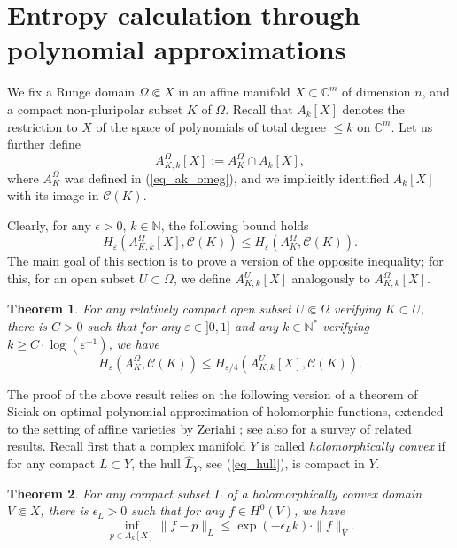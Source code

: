 \documentclass[12pt]{article}
\numberwithin{equation}{section}
\theoremstyle{theorem}
\newtheorem{thm}{Theorem}[section]
\theoremstyle{definition}
\theoremstyle{remark}
\newcommand{\comp}{\mathbb{C}}
\newcommand{\nat}{\mathbb{N}}
\begin{document}
	\section{Entropy calculation through polynomial approximations}\label{sect_poly}
	We fix a Runge domain $\Omega \Subset X$ in an affine manifold $X \subset \comp^m$ of dimension $n$, and a compact non-pluripolar subset $K$ of $\Omega$.
	Recall that $A_k[X]$ denotes the restriction to $X$ of the space of polynomials of total degree $\leq k$ on $\comp^m$.
	Let us further define
	\begin{equation}
		A_{K, k}^{\Omega}[X] := A_K^{\Omega} \cap A_k[X],
	\end{equation}
	where $A_K^{\Omega}$ was defined in (\ref{eq_ak_omeg}), and we implicitly identified $A_k[X]$ with its image in $\mathscr{C}(K)$.
	\par 
	Clearly, for any $\epsilon > 0$, $k \in \nat$, the following bound holds
	\begin{equation}\label{eq_entr_lower}
		H_{\varepsilon}(A_{K, k}^{\Omega}[X], \mathscr{C}(K))
		\leq
		H_{\varepsilon}(A_K^{\Omega}, \mathscr{C}(K)).
	\end{equation}
	The main goal of this section is to prove a version of the opposite inequality; for this, for an open subset $U \subset \Omega$, we define $A_{K, k}^{U}[X]$ analogously to $A_{K, k}^{\Omega}[X]$.
	\begin{thm}\label{thm_fin_appr}
		For any relatively compact open subset $U \Subset \Omega$ verifying $K \subset U$, there is $C > 0$ such that for any $\varepsilon \in ]0, 1]$ and any $k \in \nat^*$ verifying $k \geq C \cdot \log (\varepsilon^{-1})$, we have
		\begin{equation}
			H_{\varepsilon}(A_K^{\Omega}, \mathscr{C}(K))
			\leq
			H_{\varepsilon/4}(A_{K, k}^{U}[X], \mathscr{C}(K)).
		\end{equation}
	\end{thm}
	The proof of the above result relies on the following version of a theorem of Siciak \cite{SiciakEnvFirst} on optimal polynomial approximation of holomorphic functions, extended to the setting of affine varieties by Zeriahi \cite[Theorem 3.16 and Corollary 5.5]{ZeriahiSic}; see also \cite{LevenbergSurvAppr} for a survey of related results.
	Recall first that a complex manifold $Y$ is called \textit{holomorphically convex} if for any compact $L \subset Y$, the hull $\widehat{L}_Y$, see (\ref{eq_hull}), is compact in $Y$.
	\begin{thm}\label{thm_sic_zer}
		For any compact subset $L$ of a holomorphically convex domain $V \Subset X$, there is $\epsilon_L > 0$ such that for any $f \in H^0(V)$, we have
		\begin{equation}
			\inf_{p \in A_k[X]} \| f - p \|_{L}
			\leq 
			\exp(- \epsilon_L k) \cdot \| f \|_{V}.
		\end{equation}
	\end{thm}
\end{document}
